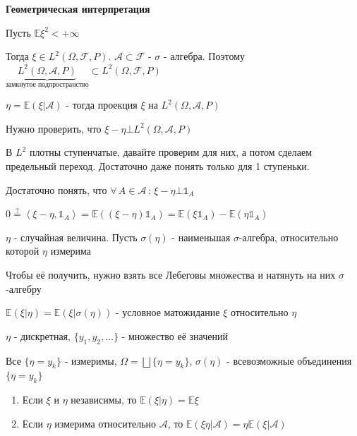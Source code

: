 \begin{remark}
    \textbf{Геометрическая интерпретация}

    Пусть $\mathbb{E} \xi^2 < +\infty$

    Тогда $\xi \in L^2 (\Omega, \mathcal{F}, P)$. $\mathcal{A} \subset \mathcal{F}$ - $\sigma$ - алгебра. Поэтому
    $\underbrace{L^2 (\Omega, \mathcal{A}, P)}_{\text{замкнутое подпространство}} \subset L^2 (\Omega, \mathcal{F}, P)$

    $\eta = \mathbb{E} (\xi | \mathcal{A})$ - тогда проекция $\xi$ на $L^2 (\Omega, \mathcal{A}, P)$

    Нужно проверить, что $\xi - \eta \bot L^2 (\Omega, \mathcal{A}, P)$

    В $L^2$ плотны ступенчатые, давайте проверим для них, а потом сделаем предельный переход. Достаточно даже понять только для 1 ступеньки.

    Достаточно понять, что $\forall \, A \in \mathcal{A} \, : \, \xi - \eta \bot \mathds{1}_A$

    $0 \overset{?}{=} \left < \xi - \eta, \mathds{1}_A \right > = \mathbb{E} ((\xi - \eta)\mathds{1}_A) = \mathbb{E}(\xi \mathds{1}_A) - \mathbb{E} (\eta \mathds{1}_A)$
\end{remark}

\begin{definition}
    $\eta$ - случайная величина. Пусть $\sigma (\eta)$ - наименьшая $\sigma$-алгебра, относительно которой $\eta$ измерима 

    \begin{remark}
        Чтобы её получить, нужно взять все Лебеговы множества и натянуть на них $\sigma$-алгебру
    \end{remark}
\end{definition}

\begin{definition}
    $\mathbb{E} (\xi | \eta) = \mathbb{E} (\xi | \sigma (\eta))$ - условное матожидание $\xi$ относительно $\eta$
\end{definition}

\begin{example}
    $\eta$ - дискретная, $\{ y_1, y_2, \ldots \}$ - множество её значений

    Все $ \{ \eta = y_k \}$ - измеримы, $\Omega = \bigsqcup \{ \eta = y_k \} $, $\sigma (\eta)$ - всевозможные объединения $\{ \eta = y_k \}$ 
\end{example}

\begin{theorem}
    \begin{enumerate}
        \item Если $\xi$ и $\eta$ независимы, то $\mathbb{E}(\xi | \eta) = \mathbb{E} \xi$
        \item Если $\eta$ измерима относительно $\mathcal{A}$, то $\mathbb{E} (\xi \eta | \mathcal{A}) = \eta \mathbb{E} (\xi | \mathcal{A})$
    \end{enumerate}
\end{theorem}

